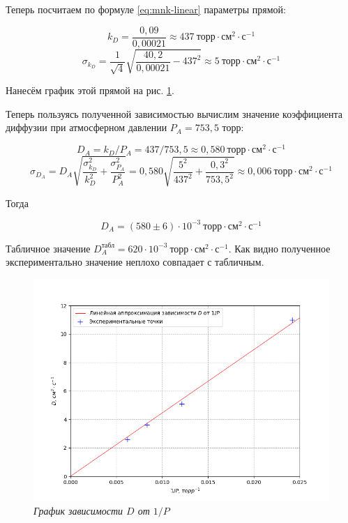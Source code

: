 \documentclass[a4paper,12pt]{article}
\begin{document}
Теперь посчитаем по формуле \eqref{eq:mnk-linear} параметры прямой:

\begin{equation*}
    k_D = \frac{0,09}{0,00021} \approx 437 \ \text{торр} \cdot \text{см}^2 \cdot \text{с}^{-1}
\end{equation*}
\begin{equation*}
    \sigma_{k_D} = \frac{1}{\sqrt{4}} \sqrt{\frac{40,2}{0,00021} - 437^2} \approx 5 \ \text{торр} \cdot \text{см}^2 \cdot \text{с}^{-1}
\end{equation*}

Нанесём график этой прямой на рис. \ref{graph:2}.

Теперь пользуясь полученной зависимостью вычислим значение коэффициента диффузии при атмосферном давлении $P_A = 753,5$ торр:

\begin{equation*}
    D_A = k_D / P_A = 437 / 753,5 \approx 0,580 \ \text{торр} \cdot \text{см}^2 \cdot \text{с}^{-1}
\end{equation*}
\begin{equation*}
    \sigma_{D_A} = D_A \sqrt{
    \frac{\sigma_{k_D}^2}{k_D^2} + \frac{\sigma_{P_A}^2}{P_A^2}} = 0,580 \sqrt{
    \frac{5^2}{437^2} + \frac{{0,3}^2}{{753,5}^2}
    } \approx 0,006 \ \text{торр} \cdot \text{см}^2 \cdot \text{с}^{-1}
\end{equation*}

Тогда

\begin{equation}
    D_A = (580 \pm 6) \cdot 10^{-3} \ \text{торр} \cdot \text{см}^2 \cdot \text{с}^{-1}
\end{equation}

Табличное значение $D_A^\text{табл} = 620 \cdot 10^{-3} \ \text{торр} \cdot \text{см}^2 \cdot \text{с}^{-1}$. Как видно полученное экспериментально значение неплохо совпадает с табличным.

\begin{figure}[h!]
        \centering
	\includegraphics[width=1\textwidth]{graph_2.png}
	\caption{\textit{График зависимости $D$ от $1/P$}}
	\label{graph:2}
\end{figure}
\end{document}
